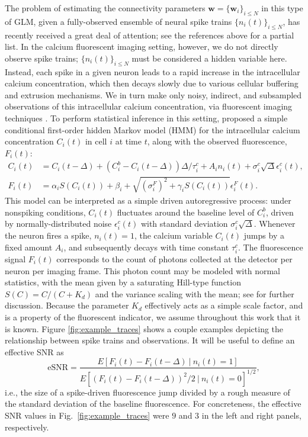 \documentclass[aoas,preprint]{imsart}
\newcommand{\w}{w}
\newcommand{\bw}{\mathbf{\w}}
\begin{document}
The problem of estimating the connectivity parameters
$\bw=\{\bw_i\}_{i\leq N}$ in this type of GLM, given a fully-observed
ensemble of neural spike trains $\{n_i(t)\}_{i\leq N}$, has recently
received a great deal of attention; see the references above for a
partial list. In the calcium fluorescent imaging setting, however, we
do not directly observe spike trains; $\{n_i(t)\}_{i\leq N}$ must be
considered a hidden variable here. Instead, each spike in a given
neuron leads to a rapid increase in the intracellular calcium
concentration, which then decays slowly due to various cellular
buffering and extrusion mechanisms. We in turn make only noisy,
indirect, and subsampled observations of this intracellular calcium
concentration, via fluorescent imaging techniques
\cite{ImagingManual}. To perform statistical inference in this
setting, \cite{Vogelstein2009} proposed a simple conditional
first-order hidden Markov model (HMM) for the intracellular calcium
concentration $C_i(t)$ in cell $i$ at time $t$, along with the
observed fluorescence, $F_i(t)$:
\begin{align}
\label{eqn:ca:definition}
C_i(t) &= C_i(t-\Delta) + \left( C_i^b-C_i(t-\Delta) \right) \Delta /
\tau^c_i + A_i n_i(t) + \sigma^c_i \sqrt{\Delta} \epsilon^c_i(t), \\
F_i(t) &= \alpha_i S(C_i(t)) + \beta_i + \sqrt{(\sigma^F_i)^2 +
\gamma_i S(C_i(t)) } \epsilon^F_i(t). \label{eqn:F:definition}
\end{align}
This model can be interpreted as a simple driven autoregressive
process: under nonspiking conditions, $C_i(t)$ fluctuates around the
baseline level of $C_i^b$, driven by normally-distributed noise
$\epsilon^c_i(t)$ with standard deviation $\sigma^c_i
\sqrt{\Delta}$. Whenever the neuron fires a spike, $n_i(t)=1$, the
calcium variable $C_i(t)$ jumps by a fixed amount $A_i$, and
subsequently decays with time constant $\tau^c_i$. The fluorescence
signal $F_i(t)$ corresponds to the count of photons collected at the
detector per neuron per imaging frame. This photon count may be
modeled with normal statistics, with the mean given by a saturating
Hill-type function $S(C)=C/(C+K_d)$ \cite{Yasuda2004} and the variance
scaling with the mean; see \cite{Vogelstein2009} for further
discussion.  Because the parameter $K_d$ effectively acts as a simple
scale factor, and is a property of the fluorescent indicator, we
assume throughout this work that it is known. Figure
\ref{fig:example_traces} shows a couple examples depicting the
relationship between spike trains and observations.  It will be useful
to define an effective SNR as
\begin{equation}
\text{eSNR} = \frac{E[F_i(t)-F_i(t-\Delta) ~|~ n_i(t)=1]}
{E[(F_i(t)-F_i(t-\Delta))^2/2 ~|~ n_i(t)=0]^{1/2}},
\label{eq:eSNR}
\end{equation}
i.e., the size of a spike-driven fluorescence jump divided by a rough
measure of the standard deviation of the baseline fluorescence.  For
concreteness, the effective SNR values in
Fig.~\ref{fig:example_traces} were $9$ and $3$ in the left and right
panels, respectively.
\end{document}
